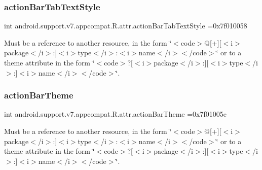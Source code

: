 \subsubsection{\texorpdfstring{action\+Bar\+Tab\+Text\+Style}{actionBarTabTextStyle}}
{\footnotesize\ttfamily int android.\+support.\+v7.\+appcompat.\+R.\+attr.\+action\+Bar\+Tab\+Text\+Style =0x7f010058\hspace{0.3cm}{\ttfamily [static]}}

Must be a reference to another resource, in the form \char`\"{}$<$code$>$@\mbox{[}+\mbox{]}\mbox{[}$<$i$>$package$<$/i$>$\+:\mbox{]}$<$i$>$type$<$/i$>$\+:$<$i$>$name$<$/i$>$$<$/code$>$\char`\"{} or to a theme attribute in the form \char`\"{}$<$code$>$?\mbox{[}$<$i$>$package$<$/i$>$\+:\mbox{]}\mbox{[}$<$i$>$type$<$/i$>$\+:\mbox{]}$<$i$>$name$<$/i$>$$<$/code$>$\char`\"{}. \mbox{\label{classandroid_1_1support_1_1v7_1_1appcompat_1_1R_1_1attr_a09e7f5fd84af8514b716aff933df644c}} 
\subsubsection{\texorpdfstring{action\+Bar\+Theme}{actionBarTheme}}
{\footnotesize\ttfamily int android.\+support.\+v7.\+appcompat.\+R.\+attr.\+action\+Bar\+Theme =0x7f01005e\hspace{0.3cm}{\ttfamily [static]}}

Must be a reference to another resource, in the form \char`\"{}$<$code$>$@\mbox{[}+\mbox{]}\mbox{[}$<$i$>$package$<$/i$>$\+:\mbox{]}$<$i$>$type$<$/i$>$\+:$<$i$>$name$<$/i$>$$<$/code$>$\char`\"{} or to a theme attribute in the form \char`\"{}$<$code$>$?\mbox{[}$<$i$>$package$<$/i$>$\+:\mbox{]}\mbox{[}$<$i$>$type$<$/i$>$\+:\mbox{]}$<$i$>$name$<$/i$>$$<$/code$>$\char`\"{}. \mbox{\label{classandroid_1_1support_1_1v7_1_1appcompat_1_1R_1_1attr_ac2e72d8d18bc18b83707e4b81ad11060}} 
